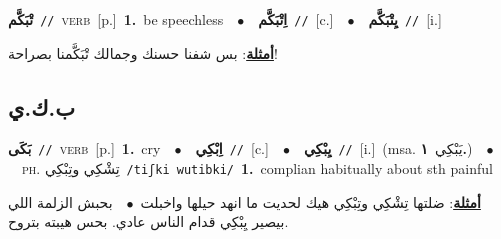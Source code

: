 \documentclass[10pt,a4paper,twoside]{article} %
\begin{document}
\begin{multicols}{2}
{\setlength\topsep{0pt}\textbf{\foreignlanguage{arabic}{تْبَكَّم}}\ {\color{gray}\texttt{//}\color{black}}\ \textsc{verb}\ [p.]\ \textbf{1.}~be speechless\ \ $\bullet$\ \ \setlength\topsep{0pt}\textbf{\foreignlanguage{arabic}{اِتْبَكَّم}}\ {\color{gray}\texttt{//}\color{black}}\ [c.]\ \ $\bullet$\ \ \setlength\topsep{0pt}\textbf{\foreignlanguage{arabic}{يِتْبَكَّم}}\ {\color{gray}\texttt{//}\color{black}}\ [i.]\  \begin{flushright}\color{gray}\foreignlanguage{arabic}{\textbf{\underline{\foreignlanguage{arabic}{أمثلة}}}: بس شفنا حسنك وجمالك تْبَكَّمنا بصراحة!}\end{flushright}\color{black}} \vspace{2mm}

\vspace{-3mm}
\subsection*{\color{blue}\foreignlanguage{arabic}{ب.ك.ي}\color{blue}{}} 

{\setlength\topsep{0pt}\textbf{\foreignlanguage{arabic}{بَكَى}}\ {\color{gray}\texttt{//}\color{black}}\ \textsc{verb}\ [p.]\ \textbf{1.}~cry\ \ $\bullet$\ \ \setlength\topsep{0pt}\textbf{\foreignlanguage{arabic}{اِبْكِي}}\ {\color{gray}\texttt{//}\color{black}}\ [c.]\ \ $\bullet$\ \ \setlength\topsep{0pt}\textbf{\foreignlanguage{arabic}{يِبْكِي}}\ {\color{gray}\texttt{//}\color{black}}\ [i.]\ \color{gray}(msa. \foreignlanguage{arabic}{يَبْكِي}~\foreignlanguage{arabic}{\textbf{١.}})\color{black}\ \ $\bullet$\ \ \textsc{ph.} \color{gray} \foreignlanguage{arabic}{تِشْكِي وتِبْكِي}\color{black}\ {\color{gray}\texttt{/{\sffamily tiʃki wutibki}/}\color{black}}\ \textbf{1.}~complian habitually about sth painful\  \begin{flushright}\color{gray}\foreignlanguage{arabic}{\textbf{\underline{\foreignlanguage{arabic}{أمثلة}}}: ضلتها تِشْكِي وتِبْكِي هيك لحديت ما انهد حيلها واخبلت\ $\bullet$\ \  بحبش الزلمة اللي بيصير يِبْكِي قدام الناس عادي. بحس هيبته بتروح.}\end{flushright}\color{black}} \vspace{2mm}


\end{multicols}
\end{document}
